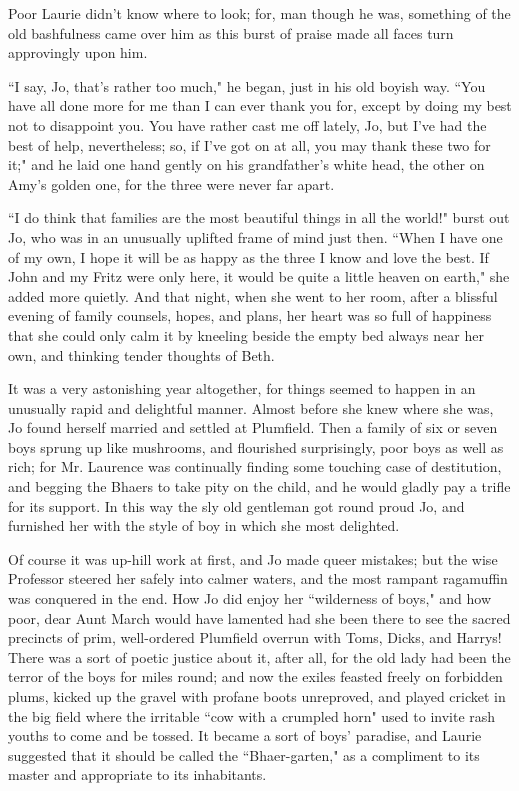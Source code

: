 Poor Laurie didn't know where to look; for, man though
he was, something of the old bashfulness came over him as this burst of
praise made all faces turn approvingly upon him.

``I say, Jo, that's rather too much," he began, just in
his old boyish way. ``You have all done more for me than I can ever thank
you for, except by doing my best not to disappoint you. You have rather
cast me off lately, Jo, but I've had the best of help,
nevertheless; so, if I've got on at all, you may thank
these two for it;" and he laid one hand gently on his
grandfather's white head, the other on
Amy's golden one, for the three were never far apart.

``I do think that families are the most beautiful things in all the
world!" burst out Jo, who was in an unusually uplifted frame of mind
just then. ``When I have one of my own, I hope it will be as happy as the
three I know and love the best. If John and my Fritz were only here, it
would be quite a little heaven on earth," she added more quietly. And
that night, when she went to her room, after a blissful evening of
family counsels, hopes, and plans, her heart was so full of happiness
that she could only calm it by kneeling beside the empty bed always near
her own, and thinking tender thoughts of Beth.

It was a very astonishing year altogether, for things seemed to happen
in an unusually rapid and delightful manner. Almost before she knew
where she was, Jo found herself married and settled at Plumfield. Then a
family of six or seven boys sprung up like mushrooms, and flourished
surprisingly, poor boys as well as rich; for Mr. Laurence was
continually finding some touching case of destitution, and begging the
Bhaers to take pity on the child, and he would gladly pay a trifle for
its support. In this way the sly old gentleman got round proud Jo, and
furnished her with the style of boy in which she most delighted.

Of course it was up-hill work at first, and Jo made queer mistakes; but
the wise Professor steered her safely into calmer waters, and the most
rampant ragamuffin was conquered in the end. How Jo did enjoy her
``wilderness of boys," and how poor, dear Aunt March would have lamented
had she been there to see the sacred precincts of prim, well-ordered
Plumfield overrun with Toms, Dicks, and Harrys! There was a sort of
poetic justice about it, after all, for the old lady had been the terror
of the boys for miles round; and now the exiles feasted freely on
forbidden plums, kicked up the gravel with profane boots unreproved, and
played cricket in the big field where the irritable ``cow with a crumpled
horn" used to invite rash youths to come and be tossed. It became a sort
of boys' paradise, and Laurie suggested that it should
be called the ``Bhaer-garten," as a compliment to its master and
appropriate to its inhabitants.

